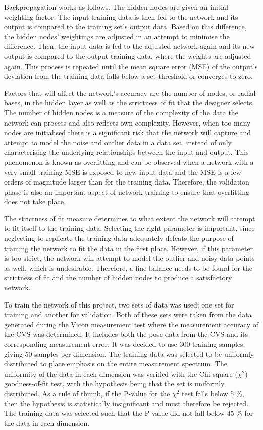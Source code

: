 Backpropagation works as follows. The hidden nodes are given an initial weighting factor. The input training data is then fed to the network and its output is compared to the training set's output data. Based on this difference, the hidden nodes' weightings are adjusted in an attempt to minimise the difference. Then, the input data is fed to the adjusted network again and its new output is compared to the output training data, where the weights are adjusted again. This process is repeated until the mean square error (MSE) of the output's deviation from the training data falls below a set threshold or converges to zero. 

Factors that will affect the network's accuracy are the number of nodes, or radial bases, in the hidden layer as well as the strictness of fit that the designer selects. The number of hidden nodes is a measure of the complexity of the data the network can process and also reflects own complexity. However, when too many nodes are initialised there is a significant risk that the network will capture and attempt to model the noise and outlier data in a data set, instead of only characterising the underlying relationships between the input and output. This phenomenon is known as overfitting and can be observed when a network with a very small training MSE is exposed to new input data and the MSE is a few orders of magnitude larger than for the training data. Therefore, the validation phase is also an important aspect of network training to ensure that overfitting does not take place. 

The strictness of fit measure determines to what extent the network will attempt to fit itself to the training data. Selecting the right parameter is important, since neglecting to replicate the training data adequately defeats the purpose of training the network to fit the data in the first place. However, if this parameter is too strict, the network will attempt to model the outlier and noisy data points as well, which is undesirable. Therefore, a fine balance needs to be found for the strictness of fit and the number of hidden nodes to produce a satisfactory network.  

To train the network of this project, two sets of data was used; one set for training and another for validation. Both of these sets were taken from the data generated during the Vicon measurement test where the measurement accuracy of the CVS was determined. It includes both the pose data from the CVS and its corresponding measurement error. It was decided to use 300 training samples, giving 50 samples per dimension. The training data was selected to be uniformly distributed to place emphasis on the entire measurement spectrum. The uniformity of the data in each dimension was verified with the Chi-square ($\chi^2$) goodness-of-fit test, with the hypothesis being that the set is uniformly distributed. As a rule of thumb, if the P-value for the $\chi^2$ test falls below 5 \%, then the hypothesis is statistically insignificant and must therefore be rejected. The training data was selected such that the P-value did not fall below 45 \% for the data in each dimension. 

